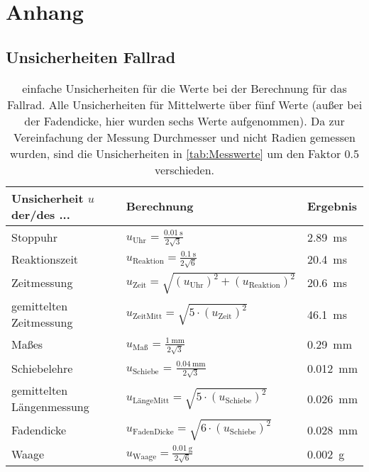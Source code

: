 \documentclass[11pt,a4paper,titlepage, ngerman]{article}
\begin{document}
	 
	\newpage
	 
	
	
	\newpage
	
	\section{Anhang} \label{Anhang}
		
	
	\subsection{Unsicherheiten Fallrad}
	
	\begin{table}[ht]
		\centering
		\caption{einfache Unsicherheiten für die Werte bei der Berechnung für das Fallrad. Alle Unsicherheiten für Mittelwerte über fünf Werte (außer bei der Fadendicke, hier wurden sechs Werte aufgenommen). Da zur Vereinfachung der Messung Durchmesser und nicht Radien gemessen wurden, sind die Unsicherheiten in \ref{tab:Messwerte} um den Faktor 0.5 verschieden.}
		\begin{tabular}{l|l|l}
			{Unsicherheit $u$ der/des ...} & {Berechnung}  & {Ergebnis}\\
			\hline 
			{Stoppuhr} &  {$u_\text{Uhr}$ = $\frac{\SI{0,01}{\second}}{2\sqrt{3}}$} & {\SI{2,89}{\milli\second}} \\
			{Reaktionszeit} & {$u_\text{Reaktion} = \frac{\SI{0,1}{\second}}{2\sqrt{6}}$} & {\SI{20,4}{\milli\second}} \\
			{Zeitmessung} & {$u_\text{Zeit} = \sqrt{\left( u_\text{Uhr}\right) ^2+\left( u_\text{Reaktion}\right) ^2}$} & {\SI{20,6}{\milli\second}} \\
			{gemittelten Zeitmessung} & {$u_\text{ZeitMitt} = \sqrt{5\cdot\left(u_\text{Zeit}\right) ^2}$} & {\SI{46,1}{\milli\second}} \\
			\hline 
			{Maßes} &  {$u_\text{Maß}$ = $\frac{\SI{1}{\mm}}{2\sqrt{3}}$} & {\SI{0,29}{\mm}} \\
			{Schiebelehre} &  {$u_\text{Schiebe}$ = $\frac{\SI{0,04}{\mm}}{2\sqrt{3}}$} & {\SI{0,012}{\mm}} \\
			{gemittelten Längenmessung} &  {$u_\text{LängeMitt} = \sqrt{5\cdot\left(u_\text{Schiebe}\right) ^2}$} & {\SI{0,026}{\mm}} \\
			{Fadendicke} &  {$u_\text{FadenDicke} = \sqrt{6\cdot\left(u_\text{Schiebe}\right) ^2}$} & {\SI{0,028}{\mm}} \\
			\hline
			{Waage} & {$u_\text{Waage} = \frac{\SI{0,01}{\g}}{2\sqrt{6}}$} & \SI{0,002}{\g}{}
		\end{tabular}
	\end{table}
\end{document}
